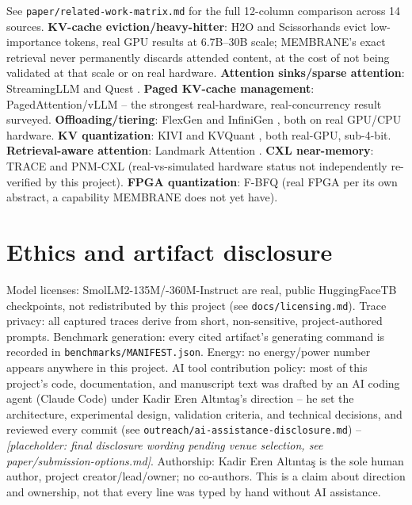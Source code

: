 \documentclass[11pt]{article}
\begin{document}
See \texttt{paper/related-work-matrix.md} for the full 12-column
comparison across 14 sources. \textbf{KV-cache eviction/heavy-hitter}:
H2O \cite{zhang2023h2o} and Scissorhands \cite{liu2023scissorhands}
evict low-importance tokens, real GPU results at 6.7B--30B scale;
MEMBRANE's exact retrieval never permanently discards attended content,
at the cost of not being validated at that scale or on real hardware.
\textbf{Attention sinks/sparse attention}: StreamingLLM
\cite{xiao2024streamingllm} and Quest \cite{tang2024quest}. \textbf{Paged
KV-cache management}: PagedAttention/vLLM \cite{kwon2023pagedattention}
-- the strongest real-hardware, real-concurrency result surveyed.
\textbf{Offloading/tiering}: FlexGen \cite{sheng2023flexgen} and
InfiniGen \cite{lee2024infinigen}, both on real GPU/CPU hardware.
\textbf{KV quantization}: KIVI \cite{liu2024kivi} and KVQuant
\cite{hooper2024kvquant}, both real-GPU, sub-4-bit. \textbf{Retrieval-aware
attention}: Landmark Attention \cite{mohtashami2023landmark}.
\textbf{CXL near-memory}: TRACE \cite{xie2025trace} and PNM-CXL
\cite{kim2025pnmcxl} (real-vs-simulated hardware status not
independently re-verified by this project). \textbf{FPGA quantization}:
F-BFQ \cite{haris2025fbfq} (real FPGA per its own abstract, a capability
MEMBRANE does not yet have).

\section{Ethics and artifact disclosure}

Model licenses: SmolLM2-135M/-360M-Instruct are real, public
HuggingFaceTB checkpoints, not redistributed by this project (see
\texttt{docs/licensing.md}). Trace privacy: all captured traces derive
from short, non-sensitive, project-authored prompts. Benchmark
generation: every cited artifact's generating command is recorded in
\texttt{benchmarks/MANIFEST.json}. Energy: no energy/power number
appears anywhere in this project. AI tool contribution policy: most of
this project's code, documentation, and manuscript text was drafted by
an AI coding agent (Claude Code) under Kadir Eren Altınta\c{s}'s
direction -- he set the architecture, experimental design, validation
criteria, and technical decisions, and reviewed every commit (see
\texttt{outreach/ai-assistance-disclosure.md}) -- \emph{[placeholder:
final disclosure wording pending venue selection, see
paper/submission-options.md]}. Authorship: Kadir Eren Altınta\c{s} is
the sole human author, project creator/lead/owner; no co-authors. This
is a claim about direction and ownership, not that every line was typed
by hand without AI assistance.
\end{document}
